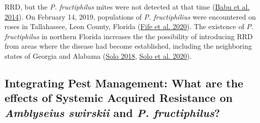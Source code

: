 \documentclass[12pt,final,CPage]{ufthesis}
\begin{document}
{RRD, but the \emph{P. fructiphilus} mites were not detected at that time (\protect\hyperlink{ref-Babu2014}{Babu et al. 2014}). On February 14, 2019, populations of \emph{P. fructiphilius} were encountered on roses in Tallahassee, Leon County, Florida (\protect\hyperlink{ref-Fife2020}{Fife et al. 2020}). The existence of \emph{P. fructiphilus} in northern Florida increases the the possibility of introducing RRD from areas where the disease had become established, including the neighboring states of Georgia and Alabama (\protect\hyperlink{ref-Solo2018}{Solo 2018}, \protect\hyperlink{ref-Solo2020}{Solo et al. 2020}).

  \hypertarget{intro-asm-ipm}{%
  \subsection{\texorpdfstring{Integrating Pest Management: What are the effects of Systemic Acquired Resistance on \emph{Amblyseius swirskii} and \emph{P. fructiphilus}?}{Integrating Pest Management: What are the effects of Systemic Acquired Resistance on Amblyseius swirskii and P. fructiphilus?}}\label{intro-asm-ipm}}

}
\end{document}
